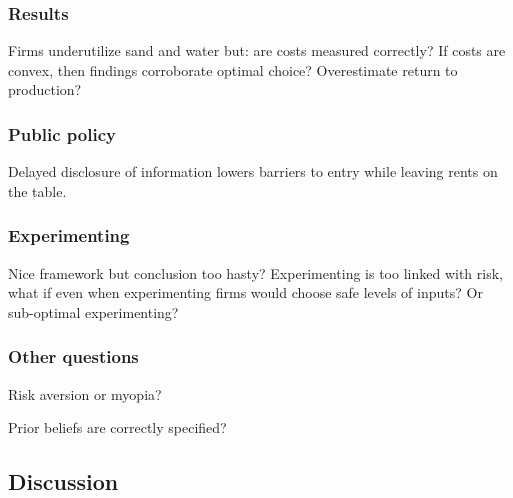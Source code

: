 \subsubsection{Results}

Firms underutilize sand and water but: are costs measured correctly? If costs are convex, then findings corroborate optimal choice? Overestimate return to production?

\subsubsection{Public policy}

Delayed disclosure of information lowers barriers to entry while leaving rents on the table.

\subsubsection{Experimenting}

Nice framework but conclusion too hasty? Experimenting is too linked with risk, what if even when experimenting firms would choose safe levels of inputs? Or sub-optimal experimenting?

\subsubsection{Other questions}

Risk aversion or myopia?

Prior beliefs are correctly specified?

\subsection{Discussion}

